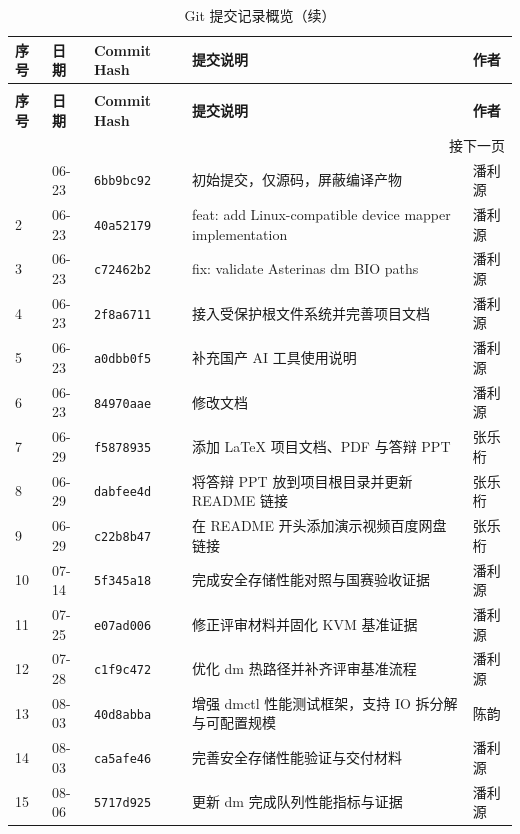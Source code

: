 \begin{longtable}{p{}p{}p{}p{}p{}}
    \caption{Git 提交记录概览} \\
    \toprule
    \textbf{序号} & \textbf{日期} & \textbf{Commit Hash} & \textbf{提交说明} & \textbf{作者} \\
    \midrule
    \endfirsthead
    \caption[]{Git 提交记录概览（续）} \\
    \toprule
    \textbf{序号} & \textbf{日期} & \textbf{Commit Hash} & \textbf{提交说明} & \textbf{作者} \\
    \midrule
    \endhead
    \midrule
    \multicolumn{5}{r}{\small 接下一页} \\
    \endfoot
    \bottomrule
    \endlastfoot
    1 & 06-23 & \texttt{6bb9bc92} & 初始提交，仅源码，屏蔽编译产物 & 潘利源 \\
    2 & 06-23 & \texttt{40a52179} & feat: add Linux-compatible device mapper implementation & 潘利源 \\
    3 & 06-23 & \texttt{c72462b2} & fix: validate Asterinas dm BIO paths & 潘利源 \\
    4 & 06-23 & \texttt{2f8a6711} & 接入受保护根文件系统并完善项目文档 & 潘利源 \\
    5 & 06-23 & \texttt{a0dbb0f5} & 补充国产 AI 工具使用说明 & 潘利源 \\
    6 & 06-23 & \texttt{84970aae} & 修改文档 & 潘利源 \\
    7 & 06-29 & \texttt{f5878935} & 添加 LaTeX 项目文档、PDF 与答辩 PPT & 张乐桁 \\
    8 & 06-29 & \texttt{dabfee4d} & 将答辩 PPT 放到项目根目录并更新 README 链接 & 张乐桁 \\
    9 & 06-29 & \texttt{c22b8b47} & 在 README 开头添加演示视频百度网盘链接 & 张乐桁 \\
    10 & 07-14 & \texttt{5f345a18} & 完成安全存储性能对照与国赛验收证据 & 潘利源 \\
    11 & 07-25 & \texttt{e07ad006} & 修正评审材料并固化 KVM 基准证据 & 潘利源 \\
    12 & 07-28 & \texttt{c1f9c472} & 优化 dm 热路径并补齐评审基准流程 & 潘利源 \\
    13 & 08-03 & \texttt{40d8abba} & 增强 dmctl 性能测试框架，支持 IO 拆分解与可配置规模 & 陈韵 \\
    14 & 08-03 & \texttt{ca5afe46} & 完善安全存储性能验证与交付材料 & 潘利源 \\
    15 & 08-06 & \texttt{5717d925} & 更新 dm 完成队列性能指标与证据 & 潘利源 \\

\end{longtable}
